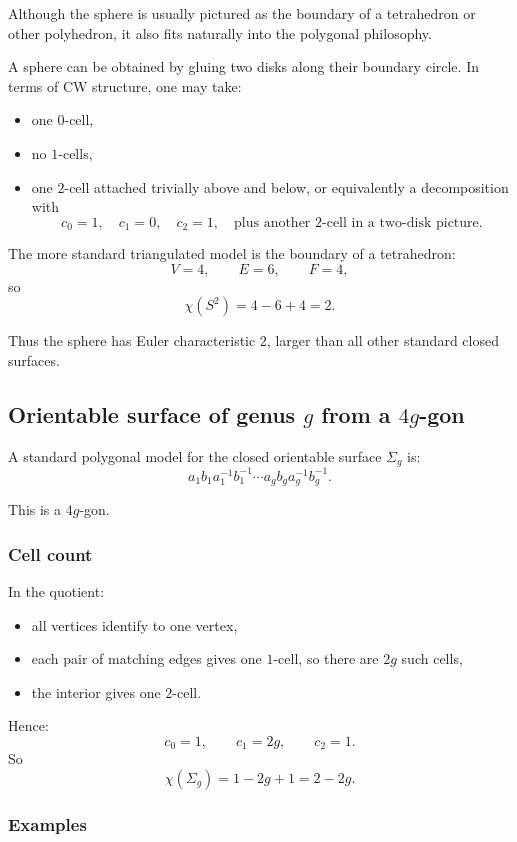 \documentclass[12pt,a4paper]{article}
\theoremstyle{notespace}
\begin{document}
Although the sphere is usually pictured as the boundary of a tetrahedron or other polyhedron, it also fits naturally into the polygonal philosophy.

A sphere can be obtained by gluing two disks along their boundary circle. In terms of CW structure, one may take:
\begin{itemize}
	\item one \(0\)-cell,
	\item no \(1\)-cells,
	\item one \(2\)-cell attached trivially above and below, or equivalently a decomposition with
	\[
	c_0=1,\quad c_1=0,\quad c_2=1,\quad \text{plus another \(2\)-cell in a two-disk picture.}
	\]
\end{itemize}

The more standard triangulated model is the boundary of a tetrahedron:
\[
V=4,\qquad E=6,\qquad F=4,
\]
so
\[
\chi(S^2)=4-6+4=2.
\]

Thus the sphere has Euler characteristic \(2\), larger than all other standard closed surfaces.

\subsection{Orientable surface of genus \(g\) from a \(4g\)-gon}

A standard polygonal model for the closed orientable surface \(\Sigma_g\) is:
\[
a_1b_1a_1^{-1}b_1^{-1}\cdots a_gb_ga_g^{-1}b_g^{-1}.
\]

This is a \(4g\)-gon.

\subsubsection*{Cell count}

In the quotient:
\begin{itemize}
	\item all vertices identify to one vertex,
	\item each pair of matching edges gives one \(1\)-cell, so there are \(2g\) such cells,
	\item the interior gives one \(2\)-cell.
\end{itemize}

Hence:
\[
c_0=1,\qquad c_1=2g,\qquad c_2=1.
\]
So
\[
\chi(\Sigma_g)=1-2g+1=2-2g.
\]

\subsubsection*{Examples}
\end{document}
